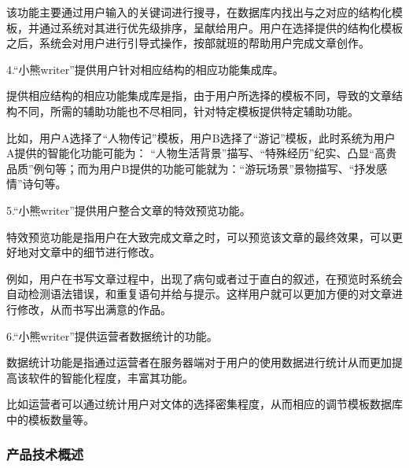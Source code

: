 \documentclass[10pt,letterpaper]{article}
\begin{document}
该功能主要通过用户输入的关键词进行搜寻，在数据库内找出与之对应的结构化模板，并通过系统对其进行优先级排序，呈献给用户。用户在选择提供的结构化模板之后，系统会对用户进行引导式操作，按部就班的帮助用户完成文章创作。

4.“小熊writer”提供用户针对相应结构的相应功能集成库。

提供相应结构的相应功能集成库是指，由于用户所选择的模板不同，导致的文章结构不同，所需的辅助功能也不尽相同，针对特定模板提供特定辅助功能。

比如，用户A选择了“人物传记”模板，用户B选择了“游记”模板，此时系统为用户A提供的智能化功能可能为： “人物生活背景”描写、“特殊经历”纪实、凸显“高贵品质”例句等；而为用户B提供的功能可能就为：“游玩场景”景物描写、“抒发感情”诗句等。

5.“小熊writer”提供用户整合文章的特效预览功能。

特效预览功能是指用户在大致完成文章之时，可以预览该文章的最终效果，可以更好地对文章中的细节进行修改。

例如，用户在书写文章过程中，出现了病句或者过于直白的叙述，在预览时系统会自动检测语法错误，和重复语句并给与提示。这样用户就可以更加方便的对文章进行修改，从而书写出满意的作品。

6.“小熊writer”提供运营者数据统计的功能。

数据统计功能是指通过运营者在服务器端对于用户的使用数据进行统计从而更加提高该软件的智能化程度，丰富其功能。

比如运营者可以通过统计用户对文体的选择密集程度，从而相应的调节模板数据库中的模板数量等。


\subsubsection{产品技术概述}
\end{document}
